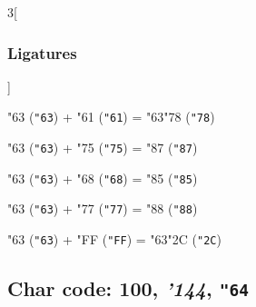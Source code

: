 \documentclass{article}
\newlength{\maxcharwidth}
\begin{document}

\begin{multicols}{3}[\subsubsection{Ligatures}]

{\testfont\char"63\noboundary} ({\tt"63}) + {\testfont\char"61\noboundary} ({\tt"61}) = {\testfont\char"63\noboundary}{\testfont\char"78\noboundary} ({\tt"78}) 

{\testfont\char"63\noboundary} ({\tt"63}) + {\testfont\char"75\noboundary} ({\tt"75}) = {\testfont\char"87\noboundary} ({\tt"87}) 

{\testfont\char"63\noboundary} ({\tt"63}) + {\testfont\char"68\noboundary} ({\tt"68}) = {\testfont\char"85\noboundary} ({\tt"85}) 

{\testfont\char"63\noboundary} ({\tt"63}) + {\testfont\char"77\noboundary} ({\tt"77}) = {\testfont\char"88\noboundary} ({\tt"88}) 

{\testfont\char"63\noboundary} ({\tt"63}) + {\testfont\char"FF\noboundary} ({\tt"FF}) = {\testfont\char"63\noboundary}{\testfont\char"2C\noboundary} ({\tt"2C}) 

\end{multicols}

\subsection{Char code: 100, {\it'144}, {\tt"64}}
\label{char_100}

\end{document}
